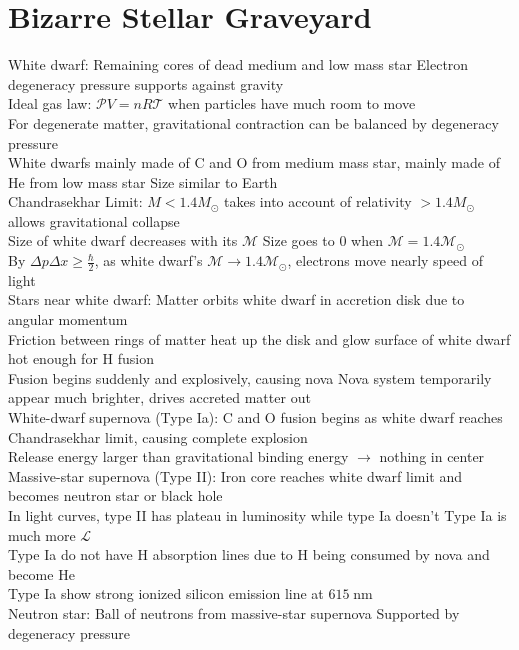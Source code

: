 \documentclass{article}
\DeclareMathOperator{\nm}{nm}
\begin{document}
\section{Bizarre Stellar Graveyard}
White dwarf: Remaining cores of dead medium and low mass star \quad Electron degeneracy pressure supports against gravity\\
Ideal gas law: $\mathcal{P}V=nR\mathcal{T}$ when particles have much room to move\\
For degenerate matter, gravitational contraction can be balanced by degeneracy pressure\\
White dwarfs mainly made of C and O from medium mass star, mainly made of He from low mass star \quad Size similar to Earth\\
Chandrasekhar Limit: $M<1.4M_{\odot}$ takes into account of relativity \quad $>1.4M_{\odot}$ allows gravitational collapse\\
Size of white dwarf decreases with its $\mathcal{M}$ \quad Size goes to $0$ when $\mathcal{M}=1.4\mathcal{M}_{\odot}$\\
By $\Delta p\Delta x\geq\frac{\hbar}{2}$, as white dwarf's $\mathcal{M}\to 1.4\mathcal{M}_{\odot}$, electrons move nearly speed of light\\
Stars near white dwarf: Matter orbits white dwarf in accretion disk due to angular momentum \\
Friction between rings of matter heat up the disk and glow \quad surface of white dwarf hot enough for H fusion \\
Fusion begins suddenly and explosively, causing nova \quad Nova system temporarily appear much brighter, drives accreted matter out\\
White-dwarf supernova (Type Ia): C and O fusion begins as white dwarf reaches Chandrasekhar limit, causing complete explosion\\
Release energy larger than gravitational binding energy $\rightarrow$ nothing in center\\
Massive-star supernova (Type II): Iron core reaches white dwarf limit and becomes neutron star or black hole\\
In light curves, type II has plateau in luminosity while type Ia doesn't \quad Type Ia is much more $\mathcal{L}$\\
Type Ia do not have H absorption lines due to H being consumed by nova and become He\\
Type Ia show strong ionized silicon emission line at $615\nm$\\
Neutron star: Ball of neutrons from massive-star supernova \quad Supported by degeneracy pressure\\
\end{document}
